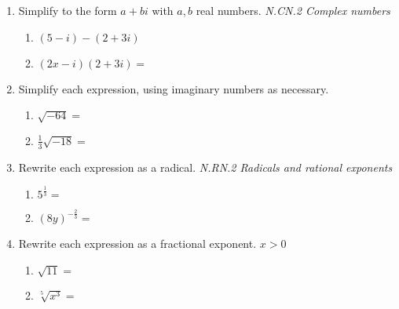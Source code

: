 \documentclass[12pt, twoside]{article}
\begin{document}
\begin{enumerate}[itemsep=0.5cm]
\item Simplify to the form $a+bi$ with $a,b$ real numbers. \hfill \emph{N.CN.2 Complex numbers}
    \begin{multicols}{2}
        \begin{enumerate}[itemsep=1.5cm]
            \item $(5 - i) - (2 + 3i)$
            \item $(2x - i)(2 + 3i)=$
        \end{enumerate}
    \end{multicols}  \vspace{5cm}

\item Simplify each expression, using imaginary numbers as necessary.
    \begin{multicols}{2}
    \begin{enumerate}[itemsep=0.5cm]
        \item $\sqrt{-64}=$
        \item $\displaystyle \frac{1}{3} \sqrt{-18}=$
    \end{enumerate}
    \end{multicols} \vspace{1cm}
  
\item Rewrite each expression as a radical. \hfill \emph{N.RN.2 Radicals and rational exponents} \vspace{0.25cm}
    \begin{multicols}{2}
      \begin{enumerate}[itemsep=1cm]
        \item $\displaystyle 5^{\frac{1}{3}}=$
        \item $\displaystyle (8y)^{-\frac{2}{3}}=$
      \end{enumerate}
      \end{multicols} \vspace{1cm}
      
\item Rewrite each expression as a fractional exponent. $x>0$  \vspace{0.25cm}
    \begin{multicols}{2}
      \begin{enumerate}[itemsep=1cm]
          \item $\sqrt{11} =$
          \item $\sqrt[5]{x^3} =$
      \end{enumerate}
      \end{multicols}

       
\end{enumerate}
\end{document}
